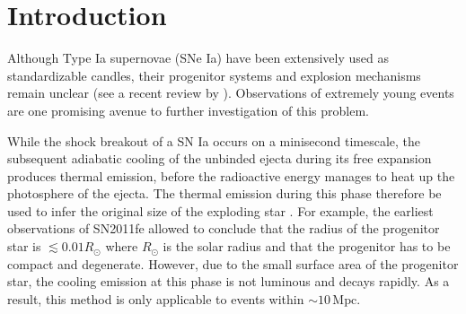 \documentclass[twocolumn]{aastex61}
\newcommand{\sr}{R_\odot}
\begin{document}


\section{Introduction}
\label{sec:intro}

Although Type Ia supernovae (SNe Ia) have been extensively used as
standardizable candles, their progenitor systems and explosion
mechanisms remain unclear (see a recent review by
\citealt{2014ARA&A..52..107M}). Observations of extremely young
events are one promising avenue to further
investigation of this problem.

While the shock breakout of a SN Ia occurs on a minisecond timescale,
the subsequent adiabatic cooling of the unbinded ejecta during its free
expansion produces thermal emission, before the radioactive energy manages
to heat up the photosphere of the ejecta. The thermal emission during this
phase therefore be used to infer the original size of the exploding star
\citep{2010ApJ...708..598P,2011ApJ...728...63R}. For example,
the earliest observations of SN2011fe allowed
\citet{2012ApJ...744L..17B} to conclude that the radius of the
progenitor star is $\lesssim0.01\sr$ where $\sr$ is the solar
radius and that the progenitor has to be compact and degenerate.
However, due to the small surface area of the progenitor star,
the cooling emission at this phase is not luminous and decays rapidly.
As a result, this method is only applicable to events
within $\sim 10\,\textrm{Mpc}$.
\end{document}
